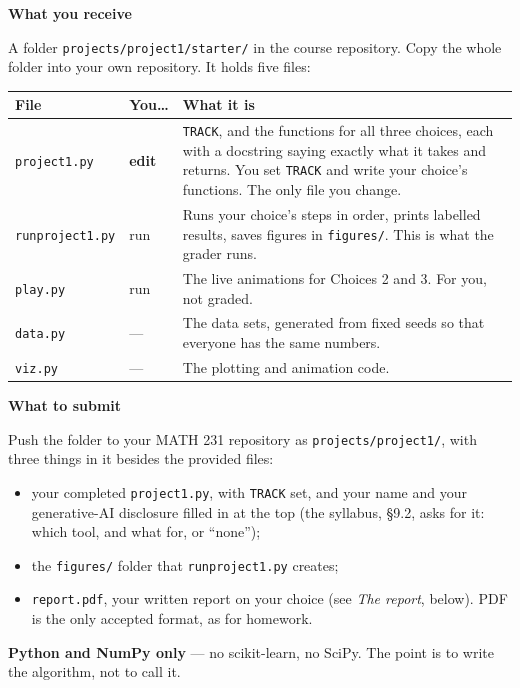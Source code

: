 \documentclass[11pt]{article}
\theoremstyle{definition}
\newenvironment{callout}[1]
  {\par\medskip\needspace{5\baselineskip}%
   \begin{lrbox}{\qcbox}%
   \begin{minipage}{\dimexpr\textwidth-2\fboxsep-4pt}%
   \setlength{\parskip}{0.4em}%
   \textbf{\sffamily\color{RoyalBlue}#1}\par}
  {\end{minipage}\end{lrbox}%
   \begin{center}\colorbox{softbg}{\usebox{\qcbox}}\end{center}\medskip}
\newcommand{\file}[1]{\texttt{#1}}
\begin{document}
\begin{callout}{What you receive}
A folder \file{projects/project1/starter/} in the course repository. Copy the
whole folder into your own repository. It holds five files:

\begin{center}
\renewcommand{\arraystretch}{1.2}
\begin{tabular}{@{}l l >{\raggedright\arraybackslash}p{8.2cm}@{}}
\toprule
\textbf{File} & \textbf{You\dots} & \textbf{What it is} \\
\midrule
\file{project1.py}    & \textbf{edit}  & \texttt{TRACK}, and the functions for
  all three choices, each with a docstring saying exactly what it takes and
  returns. You set \texttt{TRACK} and write your choice's functions. The only
  file you change. \\
\file{runproject1.py} & run     & Runs your choice's steps in order, prints
  labelled results, saves figures in \file{figures/}. This is what the grader
  runs. \\
\file{play.py}        & run     & The live animations for Choices 2 and 3. For
  you, not graded. \\
\file{data.py}        & ---     & The data sets, generated from fixed seeds so
  that everyone has the same numbers. \\
\file{viz.py}         & ---     & The plotting and animation code. \\
\bottomrule
\end{tabular}
\end{center}
\end{callout}

\begin{callout}{What to submit}
Push the folder to your MATH 231 repository as \file{projects/project1/}, with
three things in it besides the provided files:

\begin{itemize}[leftmargin=1.4em,itemsep=5pt,topsep=3pt]
  \item your completed \file{project1.py}, with \texttt{TRACK} set, and your
        name and your generative-AI disclosure filled in at the top (the
        syllabus, \S9.2, asks for it: which tool, and what for, or ``none'');
  \item the \file{figures/} folder that \file{runproject1.py} creates;
  \item \file{report.pdf}, your written report on your choice (see \emph{The
        report}, below). PDF is the only accepted format, as for homework.
\end{itemize}

\textbf{Python and NumPy only} --- no scikit-learn, no SciPy. The point is to
write the algorithm, not to call it.
\end{callout}
\end{document}
